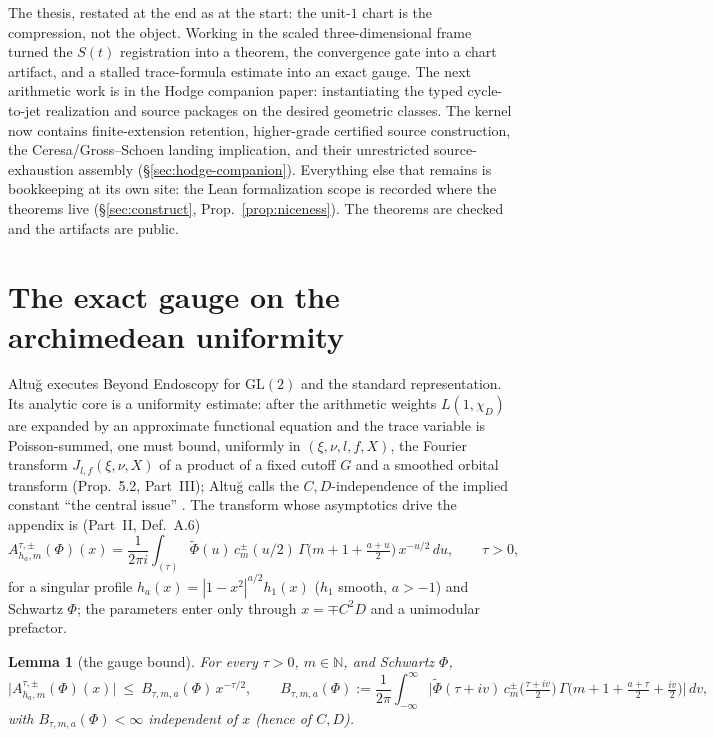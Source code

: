 \documentclass[11pt]{article}
\newtheorem{lemma}[theorem]{Lemma}
\theoremstyle{definition}
\newcommand{\wt}[1]{\widetilde{#1}}
\begin{document}
The thesis, restated at the end as at the start: the unit-$1$ chart is the
compression, not the object. Working in the scaled three-dimensional frame
turned the $S(t)$ registration into a theorem, the convergence gate into a chart
artifact, and a stalled trace-formula estimate into an exact gauge. The next arithmetic work is in
the Hodge companion paper: instantiating the typed cycle-to-jet realization and
source packages on the desired geometric classes. The kernel now contains
finite-extension retention, higher-grade certified source construction, the
Ceresa/Gross--Schoen landing implication, and their unrestricted source-exhaustion
assembly (\S\ref{sec:hodge-companion}). Everything else that remains is
bookkeeping at its own site: the Lean formalization scope is recorded where
the theorems live (\S\ref{sec:construct}, Prop.~\ref{prop:niceness}). The theorems are checked and the
artifacts are public.

\appendix{}

\section{The exact gauge on the archimedean uniformity}\label{sec:gauge}

Altu\u{g} \cite{AltI,AltII,AltIII} executes Beyond Endoscopy for $\mathrm{GL}(2)$ and the standard
representation. Its analytic core is a uniformity estimate: after the arithmetic weights $L(1,\chi_D)$
are expanded by an approximate functional equation and the trace variable is Poisson-summed, one must
bound, uniformly in $(\xi,\nu,l,f,X)$, the Fourier transform $J_{l,f}(\xi,\nu,X)$ of a product of a
fixed cutoff $G$ and a smoothed orbital transform (Prop.~5.2, Part~III); Altu\u{g} calls the
$C,D$-independence of the implied constant ``the central issue'' \cite[App.~A]{AltII}. The transform
whose asymptotics drive the appendix is (Part~II, Def.~A.6)
\begin{equation}\label{eq:A6}
  A^{\tau,\pm}_{h_a,m}(\Phi)(x)=\frac{1}{2\pi i}\int_{(\tau)}\wt\Phi(u)\,c^{\pm}_m(u/2)\,
    \Gamma\!\Big(m+1+\tfrac{a+u}{2}\Big)\,x^{-u/2}\,du,\qquad \tau>0,
\end{equation}
for a singular profile $h_a(x)=|1-x^2|^{a/2}h_1(x)$ ($h_1$ smooth, $a>-1$) and Schwartz $\Phi$; the
parameters enter only through $x=\mp C^2D$ and a unimodular prefactor.

\begin{lemma}[the gauge bound]\label{lem:mag}
For every $\tau>0$, $m\in\mathbb N$, and Schwartz $\Phi$,
\[
  \big|A^{\tau,\pm}_{h_a,m}(\Phi)(x)\big|\ \le\ B_{\tau,m,a}(\Phi)\,x^{-\tau/2},
  \qquad
  B_{\tau,m,a}(\Phi):=\frac{1}{2\pi}\!\int_{-\infty}^{\infty}\!
     \Big|\wt\Phi(\tau+iv)\,c^\pm_m\!\big(\tfrac{\tau+iv}{2}\big)\,
     \Gamma\!\big(m{+}1{+}\tfrac{a+\tau}{2}{+}\tfrac{iv}{2}\big)\Big|\,dv,
\]
with $B_{\tau,m,a}(\Phi)<\infty$ \emph{independent of $x$} (hence of $C,D$).
\end{lemma}
\end{document}
